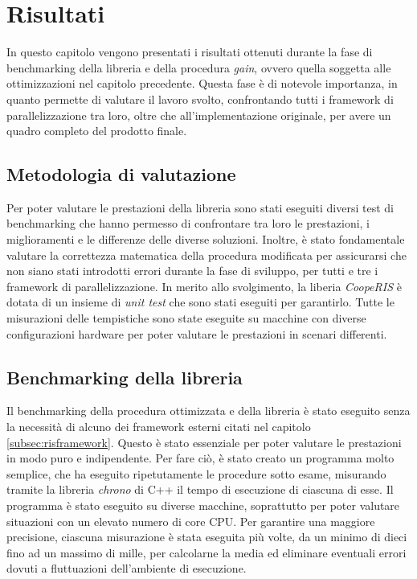 \chapter{Risultati}
\label{ch:risultati}

In questo capitolo vengono presentati i risultati ottenuti durante la fase di
benchmarking della libreria e della procedura \textit{gain}, ovvero quella
soggetta alle ottimizzazioni nel capitolo precedente. Questa fase è di notevole importanza,
in quanto permette di valutare il lavoro svolto, confrontando tutti i framework di
parallelizzazione tra loro, oltre che all'implementazione originale, per avere un
quadro completo del prodotto finale.

\section{Metodologia di valutazione}
\label{sec:bencharmking}

Per poter valutare le prestazioni della libreria sono stati eseguiti diversi
test di benchmarking che hanno permesso di confrontare tra loro le prestazioni, i
miglioramenti e le differenze delle diverse soluzioni. Inoltre, è stato fondamentale
valutare la correttezza matematica della procedura modificata per assicurarsi che
non siano stati introdotti errori durante la fase di sviluppo, per tutti e tre i
framework di parallelizzazione. In merito allo svolgimento, la liberia \textit{CoopeRIS}
è dotata di un insieme di \textit{unit test} che sono stati eseguiti per
garantirlo. Tutte le misurazioni delle tempistiche sono state eseguite su macchine
con diverse configurazioni hardware per poter valutare le prestazioni in scenari
differenti.

\section{Benchmarking della libreria}
\label{sec:benchmarking}

Il benchmarking della procedura ottimizzata e della libreria è stato eseguito
senza la necessità di alcuno dei framework esterni citati nel capitolo
\ref{subsec:risframework}. Questo è stato essenziale per poter valutare le prestazioni
in modo puro e indipendente. Per fare ciò, è stato creato un programma molto semplice,
che ha eseguito ripetutamente le procedure sotto esame, misurando tramite la libreria
\textit{chrono} di C++ il tempo di esecuzione di ciascuna di esse. Il programma è
stato eseguito su diverse macchine, soprattutto per poter valutare situazioni
con un elevato numero di core CPU. Per garantire una maggiore precisione,
ciascuna misurazione è stata eseguita più volte, da un minimo di dieci fino ad un
massimo di mille, per calcolarne la media ed eliminare eventuali errori dovuti a
fluttuazioni dell'ambiente di esecuzione.

